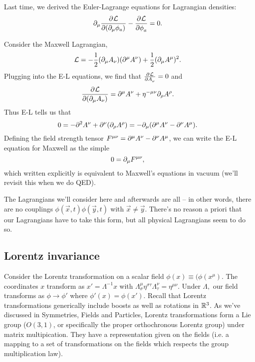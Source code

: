 Last time, we derived the Euler-Lagrange equations for Lagrangian densities:
\begin{equation}
\partial_\mu \frac{\partial^{} \mathcal{L}}{\partial (\partial_\mu \phi_a) ^{}}-\frac{\partial^{} \mathcal{L}}{\partial \phi_a ^{}}=0.
\end{equation}

\begin{exm}
Consider the Maxwell Lagrangian,
\begin{equation}
\mathcal{L}=-\frac{1}{2}(\partial_\mu A_\nu)(\partial^\mu A^\nu)+\frac{1}{2}(\partial_\mu A^\mu)^2.
\end{equation}
Plugging into the E-L equations, we find that $\frac{\partial^{} \mathcal L}{\partial A_\nu ^{}}=0$ and
\begin{equation}
\frac{\partial^{} \mathcal L}{\partial (\partial_\mu A_\nu) ^{}}=\partial^\mu A^\nu +\eta^{-\mu\nu}\partial_\rho A^\rho.
\end{equation}
Thus E-L tells us that
\begin{equation}
0=-\partial^2 A^\nu+\partial^\nu (\partial_\rho A^\rho)=-\partial_\mu(\partial^\mu A^\nu-\partial^\nu A^\mu).
\end{equation}
Defining the field strength tensor $F^{\mu\nu}=\partial^\mu A^\nu-\partial^\nu A^\mu$, we can write the E-L equation for Maxwell as the simple
$$0=\partial_\mu F^{\mu\nu},$$
which written explicitly is equivalent to Maxwell's equations in vacuum (we'll revisit this when we do QED).
\end{exm}

The Lagrangians we'll consider here and afterwards are all -- in other words, there are no couplings $\phi(\vec{x},t)\phi(\vec{y},t)$ with $\vec{x}\neq \vec{y}$. There's no reason a priori that our Lagrangians have to take this form, but all physical Lagrangians seem to do so.

\subsection*{Lorentz invariance} Consider the Lorentz transformation on a scalar field $\phi(x)\equiv (\phi (x^\mu)$. The coordinates $x$ transform as $x'=\Lambda^{-1} x$ with $\Lambda^\mu_\sigma \eta^{\sigma\tau}\Lambda_\tau^\nu = \eta^{\mu\nu}$. Under $\Lambda,$ our field transforms as $\phi\to \phi'$ where $\phi'(x)=\phi(x')$. Recall that Lorentz transformations generically include boosts as well as rotations in $\mathbb{R}^3$. As we've discussed in Symmetries, Fields and Particles, Lorentz transformations form a Lie group ($O(3,1)$, or specifically the proper orthochronous Lorentz group) under matrix multipication. They have a representation given on the fields (i.e. a mapping to a set of transformations on the fields which respects the group multiplication law).

